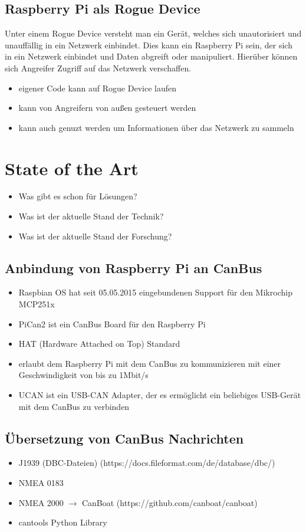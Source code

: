 \subsection{Raspberry Pi als Rogue Device}
Unter einem Rogue Device versteht man ein Gerät, welches sich unautorisiert und unauffällig in ein Netzwerk einbindet.
Dies kann ein Raspberry Pi sein, der sich in ein Netzwerk einbindet und Daten abgreift oder manipuliert. Hierüber können 
sich Angreifer Zugriff auf das Netzwerk verschaffen. 
\begin{itemize}
    \item eigener Code kann auf Rogue Device laufen
    \item kann von Angreifern von außen gesteuert werden
    \item kann auch genuzt werden um Informationen über das Netzwerk zu sammeln
\end{itemize}

\section{State of the Art}
\begin{itemize}
    \item Was gibt es schon für Lösungen?
    \item Was ist der aktuelle Stand der Technik?
    \item Was ist der aktuelle Stand der Forschung?
\end{itemize}
\subsection{Anbindung von Raspberry Pi an CanBus}
\begin{itemize}
    \item Raspbian OS hat seit 05.05.2015 eingebundenen Support für den Mikrochip MCP251x
\end{itemize}
\cite{Salunkhe2016}
\begin{itemize}
    \item PiCan2 ist ein CanBus Board für den Raspberry Pi
    \item HAT (Hardware Attached on Top) Standard
    \item erlaubt dem Raspberry Pi mit dem CanBus zu kommunizieren mit einer Geschwindigkeit von bis zu 1Mbit/s
    \item UCAN ist ein USB-CAN Adapter, der es ermöglicht ein beliebiges USB-Gerät mit dem CanBus zu verbinden
\end{itemize}
\cite{Pant2019}
\subsection{Übersetzung von CanBus Nachrichten}
\begin{itemize}
    \item J1939 (DBC-Dateien) (https://docs.fileformat.com/de/database/dbc/)
    \item NMEA 0183 
    \item NMEA 2000 $\rightarrow$ CanBoat (https://github.com/canboat/canboat)
    \item cantools Python Library 
\end{itemize}